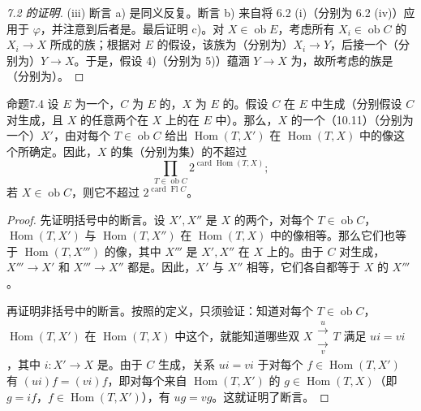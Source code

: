 \begin{proof}[7.2 的证明]
(iii) 断言 a) 是同义反复。断言 b) 来自将 6.2 (i)（分别为 6.2 (iv)）应用于 $\varphi$，并注意到后者是。最后证明 c)。对 $X\in\operatorname{ob}E$，考虑所有 $X_i\in\operatorname{ob}C$ 的 $X_i\to X$ 所成的族；根据对 $E$ 的假设，该族为（分别为）$X_i\to Y$，后接一个（分别为）$Y\to X$。于是，假设 4)（分别为 5)）蕴涵 $Y\to X$ 为，故所考虑的族是（分别为）。
\end{proof}
\begin{SGAresult}{命题}{7.4}
设 $E$ 为一个，$C$ 为 $E$ 的，$X$ 为 $E$ 的。假设 $C$ 在 $E$ 中生成（分别假设 $C$ 对生成，且 $X$ 的任意两个在 $X$ 上的在 $E$ 中）。那么，$X$ 的一个（10.11）（分别为一个）$X'$，由对每个 $T\in\operatorname{ob}C$ 给出 $\operatorname{Hom}(T,X')$ 在 $\operatorname{Hom}(T,X)$ 中的像这个所确定。因此，$X$ 的集（分别为集）的不超过
\[
\prod_{T\in\operatorname{ob}C}2^{\operatorname{card}\operatorname{Hom}(T,X)};
\]
若 $X\in\operatorname{ob}C$，则它不超过 $2^{\operatorname{card}\operatorname{Fl}C}$。
\end{SGAresult}
\begin{proof}
先证明括号中的断言。设 $X',X''$ 是 $X$ 的两个，对每个 $T\in\operatorname{ob}C$，$\operatorname{Hom}(T,X')$ 与 $\operatorname{Hom}(T,X'')$ 在 $\operatorname{Hom}(T,X)$ 中的像相等。那么它们也等于 $\operatorname{Hom}(T,X''')$ 的像，其中 $X'''$ 是 $X',X''$ 在 $X$ 上的。由于 $C$ 对生成， $X'''\to X'$ 和 $X'''\to X''$ 都是。因此，$X'$ 与 $X''$ 相等，它们各自都等于 $X$ 的 $X'''$。

再证明非括号中的断言。按照的定义，只须验证：知道对每个 $T\in\operatorname{ob}C$，$\operatorname{Hom}(T,X')$ 在 $\operatorname{Hom}(T,X)$ 中这个，就能知道哪些双 $X\mathrel{\substack{\xrightarrow{u}\\[-.6ex]\xrightarrow[v]{}}}T$ 满足 $ui=vi$，其中 $i:X'\to X$ 是。由于 $C$ 生成，关系 $ui=vi$ 于对每个 $f\in\operatorname{Hom}(T,X')$ 有 $(ui)f=(vi)f$，即对每个来自 $\operatorname{Hom}(T,X')$ 的 $g\in\operatorname{Hom}(T,X)$（即 $g=if$，$f\in\operatorname{Hom}(T,X')$），有 $ug=vg$。这就证明了断言。
\end{proof}
